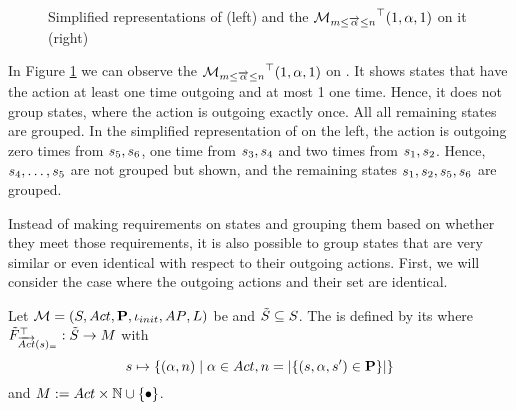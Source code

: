 \documentclass[preview]{standalone}
\begin{document}
\begin{figure}[!htb]
	\begin{minipage}{.5\textwidth}
		\hspace{5mm}
		
	\end{minipage}%
	\begin{minipage}{.5\textwidth}
		\hspace{5mm}
		
	\end{minipage}
	\caption{Simplified representations of \mdp (left) and the \viewN ${{{{{\mathcal{M}}}}_{{{m}\leq{\overrightarrow{\ensuremath{{\alpha}}}}\leq{n}}}}^{\top}}(1, {\alpha}, 1)$ on it (right)}
	\label{fig:outActSpan}
\end{figure}
\begin{exmp}
	In Figure \ref{fig:outActSpan} we can observe the \viewN ${{{{{\mathcal{M}}}}_{{{m}\leq{\overrightarrow{\ensuremath{{\alpha}}}}\leq{n}}}}^{\top}}(1, {\alpha}, 1)$ on \mdp. It shows states that have the action \action at least one time outgoing and at most 1 one time. Hence, it does not group states, where the action \action is outgoing exactly once. All all remaining states are grouped. In the simplified representation of \achgphN on the left, the action \action is outgoing zero times from ${s}_5, {s}_6$, one time from ${s}_3, {s}_4$ and two times from ${s}_1, {s}_2$. Hence, ${s}_4, \dots, {s}_5$ are not grouped but shown, and the remaining states ${s}_1, {s}_2, {s}_5, {s}_6$ are grouped.
\end{exmp}



Instead of making requirements on states and grouping them based on whether they meet those requirements, it is also possible to group states that are very similar or even identical with respect to their outgoing actions. First, we will consider the case where the outgoing actions and their set are identical.

\begin{definition}
	Let ${{{\mathcal{M}}}} = {{({S}, {Act}, {\textbf{P}}, {\iota_{init}}, {AP}, {L})}}$ be \achgphN and ${\tilde{{S}}} \subseteq {S}$. The \viewN \viewstrongoutactident is defined by its \grpfctN \gfctstrongoutactident where $\gfctsubstrongoutactident : \smstates \to \imggrp$ with
	\[
	{s} \mapsto	
	\{({\alpha}, {n}) \mid {\alpha} \in {Act}, n = |\{ ({s}, {\alpha}, {s}') \in {\ensuremath{{\textbf{P}}}}\}|\}
	\]
	and $\imggrp := \actions \times \natnums \cup \remset$.
\end{definition}
\end{document}
